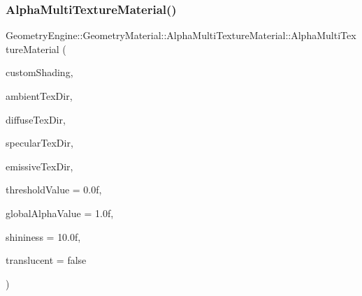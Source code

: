 \subsubsection{\texorpdfstring{AlphaMultiTextureMaterial()}{AlphaMultiTextureMaterial()}\hspace{0.1cm}{\footnotesize\ttfamily [1/3]}}
{\footnotesize\ttfamily Geometry\+Engine\+::\+Geometry\+Material\+::\+Alpha\+Multi\+Texture\+Material\+::\+Alpha\+Multi\+Texture\+Material (\begin{DoxyParamCaption}\item[{const \mbox{\hyperlink{class_geometry_engine_1_1_custom_shading_1_1_custom_shading_interface}{Custom\+Shading\+::\+Custom\+Shading\+Interface}} $\ast$const}]{custom\+Shading,  }\item[{const std\+::string \&}]{ambient\+Tex\+Dir,  }\item[{const std\+::string \&}]{diffuse\+Tex\+Dir,  }\item[{const std\+::string \&}]{specular\+Tex\+Dir,  }\item[{const std\+::string \&}]{emissive\+Tex\+Dir,  }\item[{float}]{threshold\+Value = {\ttfamily 0.0f},  }\item[{float}]{global\+Alpha\+Value = {\ttfamily 1.0f},  }\item[{float}]{shininess = {\ttfamily 10.0f},  }\item[{bool}]{translucent = {\ttfamily false} }\end{DoxyParamCaption})}

